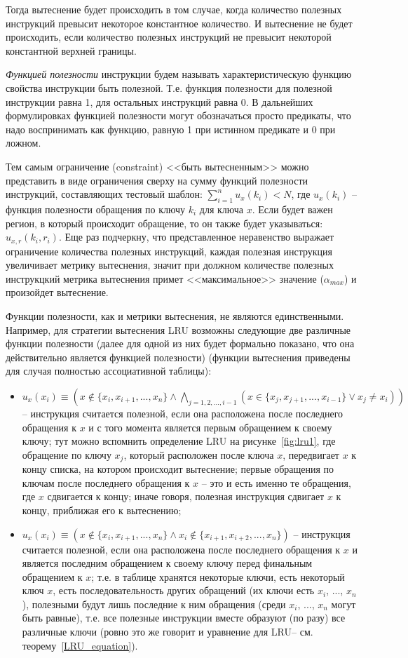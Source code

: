 \documentclass[14pt]{extreport}
\newcommand{\LRU}{\textsf{LRU}\xspace}
\begin{document}
Тогда вытеснение будет происходить в том случае, когда количество
полезных инструкций превысит некоторое константное количество.
И вытеснение не будет происходить, если количество полезных инструкций
не превысит некоторой константной верхней границы.

\emph{Функцией полезности} инструкции будем называть характеристическую функцию свойства инструкции быть полезной. Т.е. функция полезности для полезной инструкции равна 1, для остальных инструкций равна 0. В дальнейших формулировках функцией полезности могут обозначаться просто предикаты, что надо воспринимать как функцию, равную 1 при истинном предикате и 0 при ложном.

Тем самым ограничение (constraint) <<быть вытесненным>> можно представить в виде ограничения сверху на сумму функций полезности инструкций, составляющих тестовый шаблон: $\sum_{i=1}^n u_x(k_i) < N$, где $u_x(k_i)$ -- функция полезности обращения по ключу $k_i$ для ключа $x$. Если будет важен регион, в который происходит обращение, то он также будет указываться: $u_{x,r}(k_i, r_i)$. Еще раз подчеркну, что представленное неравенство выражает ограничение количества полезных инструкций, каждая полезная инструкция увеличивает метрику вытеснения, значит при должном количестве полезных инструкцкий метрика вытеснения примет <<максимальное>> значение ($\alpha_{max}$) и произойдет вытеснение.

Функции полезности, как и метрики вытеснения, не являются единственными. Например, для стратегии вытеснения \LRU возможны следующие две различные функции полезности (далее для одной из них будет формально показано, что она действительно является функцией полезности) (функции вытеснения приведены для случая полностью ассоциативной таблицы):
\begin{itemize}
  \item $u_x(x_i) \equiv (x \notin \{x_i, x_{i+1}, ..., x_n\} \wedge \bigwedge\limits_{j=1,2,...,i-1} (x \in \{x_j, x_{j+1}, ..., x_{i-1}\} \vee x_j \neq x_i))$ -- инструкция считается полезной, если она расположена после последнего обращения к $x$ и с того момента является первым обращением к своему ключу; тут можно вспомнить определение \LRU на рисунке~\ref{fig:lru1}, где обращение по ключу $x_j$, который расположен после ключа $x$, передвигает $x$ к концу списка, на котором происходит вытеснение; первые обращения по ключам после последнего обращения к $x$ -- это и есть именно те обращения, где $x$ сдвигается к концу; иначе говоря, полезная инструкция сдвигает $x$ к концу, приближая его к вытеснению;
  \item $u_x(x_i) \equiv (x \notin \{x_i, x_{i+1}, ..., x_n\} \wedge x_i \notin \{x_{i+1}, x_{i+2}, ..., x_n\})$ -- инструкция считается полезной, если она расположена после последнего обращения к $x$ и является последним обращением к своему ключу перед финальным обращением к $x$; т.е. в таблице хранятся некоторые ключи, есть некоторый ключ $x$, есть последовательность других обращений (их ключи есть $x_i$, ..., $x_n$), полезными будут лишь последние к ним обращения (среди $x_i$, ..., $x_n$ могут быть равные), т.е. все полезные инструкции вместе образуют (по разу) все различные ключи (ровно это же говорит и уравнение для \LRU -- см. теорему~\ref{LRU_equation}).
\end{itemize}
\end{document}

